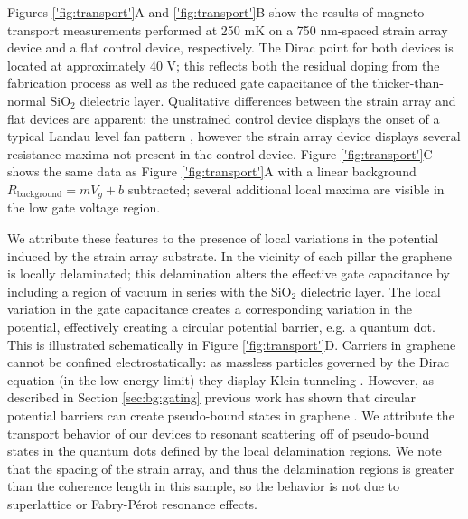 \documentclass[edeposit,fullpage,draftthesis]{uiucthesis2009}
\begin{document}
            Figures \ref{'fig:transport'}A and \ref{'fig:transport'}B show the results of magneto-transport 
            measurements performed at 250 mK on a 750 nm-spaced strain array device and a flat control device, respectively.
            The Dirac point for both devices is located at approximately 40 V; this reflects both the residual doping
            from the fabrication process as well as the reduced gate capacitance of the thicker-than-normal SiO$_2$ dielectric layer.
            Qualitative differences between the strain array and flat devices are apparent: 
            the unstrained control device displays the onset of a typical Landau level fan pattern \cite{bolotin2009observation}, 
            however the strain array device displays several resistance maxima not present in the control device.
            Figure \ref{'fig:transport'}C shows the same data as Figure \ref{'fig:transport'}A with a linear background 
            $R_\text{background} = m V_g + b$ subtracted; several additional local maxima are visible in the low gate voltage region.
            
            We attribute these features to the presence of local variations in the potential induced by the strain array substrate.
            In the vicinity of each pillar the graphene is locally delaminated; this delamination alters the 
            effective gate capacitance by including a region of vacuum in series with the SiO$_2$ dielectric layer.
            The local variation in the gate capacitance creates a corresponding variation in the potential,
            effectively creating a circular potential barrier, e.g. a quantum dot. This is illustrated schematically
            in Figure \ref{'fig:transport'}D.
            Carriers in graphene cannot be confined electrostatically: as massless particles governed by the Dirac equation
            (in the low energy limit)
            they display Klein tunneling \cite{katsnelson2006chiral,young2009quantum}.
            However, as described in Section \ref{sec:bg:gating}
            previous work has shown that circular potential barriers can create pseudo-bound states in 
            graphene \cite{silvestrov2007quantum,matulis2008quasibound,hewageegana2008electron,chen2007fock, heinisch2013mie}.
            We attribute the transport behavior of our devices to resonant scattering off of pseudo-bound
            states in the quantum dots defined by the local delamination regions.
            We note that the spacing of the strain array, and thus the delamination regions is greater than the coherence length
            in this sample, so the behavior is not due to superlattice or Fabry-P\'erot resonance effects.
            
\end{document}
